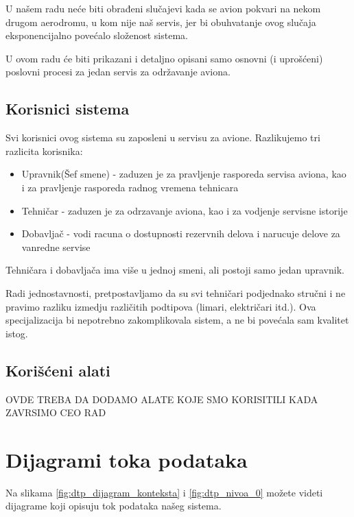 \documentclass[a4paper]{article}
\begin{document}
U našem radu neće biti obrađeni slučajevi kada se avion pokvari na nekom drugom aerodromu, u kom nije naš servis, jer bi obuhvatanje ovog slučaja  eksponencijalno povećalo složenost sistema.

U ovom radu će biti prikazani i detaljno opisani samo osnovni (i uprošćeni) poslovni procesi za jedan servis za održavanje aviona.
    


\subsection{Korisnici sistema}
\label{subsec:korisnici_sistema}
Svi korisnici ovog sistema su zaposleni u servisu za avione. Razlikujemo tri razlicita korisnika:
\begin{itemize}
    \item Upravnik(Šef smene) - zaduzen je za pravljenje rasporeda servisa aviona, kao i za pravljenje rasporeda radnog vremena tehnicara
    \item Tehničar - zaduzen je za odrzavanje aviona, kao i za vodjenje servisne istorije
    \item Dobavljač - vodi racuna o dostupnosti rezervnih delova i narucuje delove za vanredne servise
\end{itemize}
Tehničara i dobavljača ima više u jednoj smeni, ali postoji samo jedan upravnik.

Radi jednostavnosti, pretpostavljamo da su svi tehničari podjednako stručni i ne pravimo razliku izmedju različitih podtipova (limari, električari itd.). Ova specijalizacija bi nepotrebno zakomplikovala sistem, a ne bi povećala sam kvalitet istog.

\subsection{Korišćeni alati}
\label{subsec:korisceni_alati}

OVDE TREBA DA DODAMO ALATE KOJE SMO KORISITILI KADA ZAVRSIMO CEO RAD

\section{Dijagrami toka podataka}
\label{sec:dijagrami_toka_podataka}
Na slikama \ref{fig:dtp_dijagram_konteksta} i \ref{fig:dtp_nivoa_0} možete videti dijagrame koji opisuju tok podataka našeg sistema. 
\end{document}
